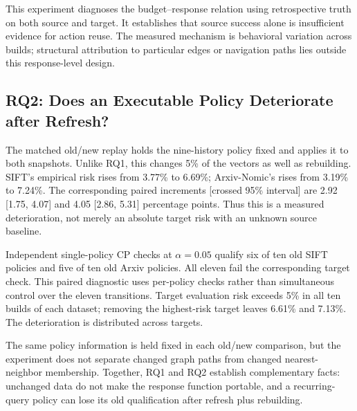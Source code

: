 This experiment diagnoses the budget--response relation using retrospective truth on both source and target. It establishes that source success alone is insufficient evidence for action reuse. The measured mechanism is behavioral variation across builds; structural attribution to particular edges or navigation paths lies outside this response-level design.

\subsection{RQ2: Does an Executable Policy Deteriorate after Refresh?}
The matched old/new replay holds the nine-history policy fixed and applies it to both snapshots. Unlike RQ1, this changes 5\% of the vectors as well as rebuilding. SIFT's empirical risk rises from 3.77\% to 6.69\%; Arxiv-Nomic's rises from 3.19\% to 7.24\%. The corresponding paired increments [crossed 95\% interval] are 2.92 [1.75, 4.07] and 4.05 [2.86, 5.31] percentage points. Thus this is a measured deterioration, not merely an absolute target risk with an unknown source baseline.

Independent single-policy CP checks at $\alpha=0.05$ qualify six of ten old SIFT policies and five of ten old Arxiv policies. All eleven fail the corresponding target check. This paired diagnostic uses per-policy checks rather than simultaneous control over the eleven transitions. Target evaluation risk exceeds 5\% in all ten builds of each dataset; removing the highest-risk target leaves 6.61\% and 7.13\%. The deterioration is distributed across targets.

The same policy information is held fixed in each old/new comparison, but the experiment does not separate changed graph paths from changed nearest-neighbor membership. Together, RQ1 and RQ2 establish complementary facts: unchanged data do not make the response function portable, and a recurring-query policy can lose its old qualification after refresh plus rebuilding.
